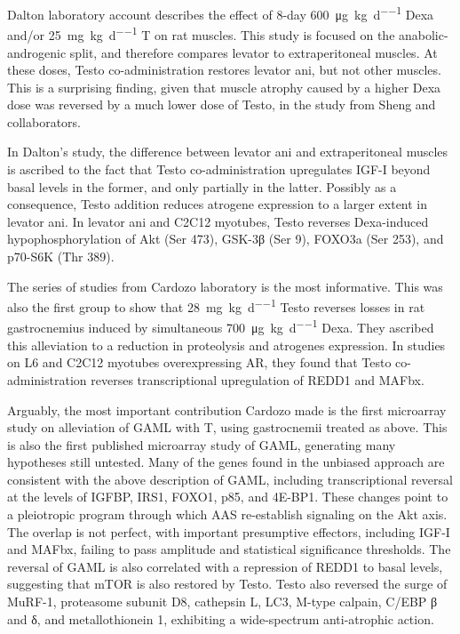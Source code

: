 \documentclass[12pt,english]{report}\usepackage[]{graphicx}\usepackage[]{color}
\begin{document}
Dalton laboratory account describes the effect of 8-day \SI{600}{\micro\gram\per\kilo\gram\per\day}
Dexa and/or \SI{25}{\milli\gram\per\kilo\gram\per\day} T\citep{jones2010effects}
on rat muscles. This study is focused on the anabolic-androgenic split,
and therefore compares levator to extraperitoneal muscles. At these
doses, Testo co-administration restores levator ani, but not other
muscles. This is a surprising finding, given that muscle atrophy caused
by a higher Dexa dose was reversed by a much lower dose of Testo,
in the study from Sheng and collaborators.

In Dalton's study, the difference between levator ani and extraperitoneal
muscles is ascribed to the fact that Testo co-administration upregulates
IGF-I beyond basal levels in the former, and only partially in the
latter. Possibly as a consequence, Testo addition reduces atrogene
expression to a larger extent in levator ani. In levator ani and C2C12
myotubes, Testo reverses Dexa-induced hypophosphorylation of Akt (Ser
473), GSK-3β (Ser 9), FOXO3a (Ser 253), and p70-S6K (Thr 389).

The series of studies from Cardozo laboratory is the most informative.
This was also the first group to show that \SI{28}{\milli\gram\per\kilo\gram\per\day}
Testo reverses losses in rat gastrocnemius induced by simultaneous
\SI{700}{\micro\gram\per\kilo\gram\per\day} Dexa\citep{zhao2008testosterone}.
They ascribed this alleviation to a reduction in proteolysis and atrogenes
expression. In studies on L6 and C2C12 myotubes overexpressing AR,
they found that Testo co-administration reverses transcriptional upregulation
of REDD1 and MAFbx\citep{zhao2008expression,wu2010redd1}.

Arguably, the most important contribution Cardozo made is the first
microarray study on alleviation of GAML with T\citep{wu2010redd1},
using gastrocnemii treated as above. This is also the first published
microarray study of GAML, generating many hypotheses still untested.
Many of the genes found in the unbiased approach are consistent with
the above description of GAML, including transcriptional reversal
at the levels of IGFBP, IRS1, FOXO1, p85, and 4E-BP1. These changes
point to a pleiotropic program through which AAS re-establish signaling
on the Akt axis. The overlap is not perfect, with important presumptive
effectors, including IGF-I and MAFbx, failing to pass amplitude and
statistical significance thresholds. The reversal of GAML is also
correlated with a repression of REDD1 to basal levels, suggesting
that mTOR is also restored by Testo. Testo also reversed the surge
of MuRF-1, proteasome subunit D8, cathepsin L, LC3, M-type calpain,
C/EBP β and δ, and metallothionein 1, exhibiting a wide-spectrum anti-atrophic
action.
\end{document}
